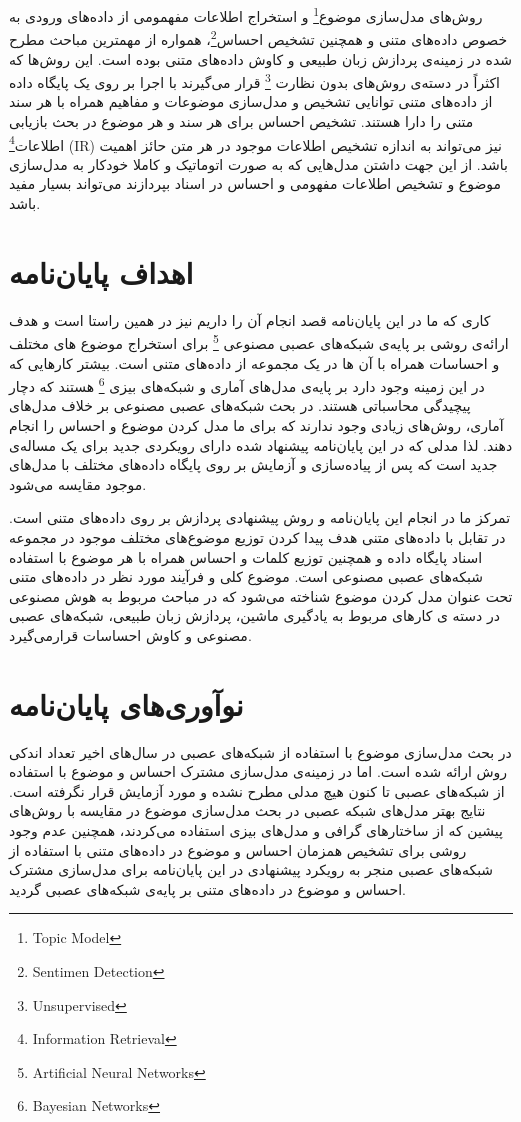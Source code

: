  		روش‌های مدل‌سازی موضوع\footnote{Topic Model}
 		و استخراج اطلاعات مفهمومی از داده‌های ورودی به خصوص داده‌های متنی و همچنین تشخیص احساس\footnote{Sentimen Detection}،
 		 همواره از مهمترین مباحث مطرح شده در زمینه‌ی پردازش زبان طبیعی و کاوش داده‌های متنی بوده است. این روش‌ها که اکثراً در دسته‌ی روش‌های بدون نظارت \footnote{Unsupervised}
 		 قرار می‌‌گیرند با اجرا بر روی یک پایگاه داده‌ از داده‌های متنی توانایی تشخیص و مدل‌سازی موضوعات و مفاهیم همراه با هر سند متنی را دارا هستند. تشخیص احساس برای هر سند و هر موضوع در بحث بازیابی اطلاعات\footnote{Information Retrieval}
 (IR)
 		 نیز می‌‌تواند به اندازه تشخیص اطلاعات موجود در هر متن حائز اهمیت باشد. از این جهت داشتن مدل‌هایی که به صورت اتوماتیک و کاملا خودکار به مدل‌سازی موضوع و تشخیص اطلاعات مفهومی‌ و احساس در اسناد بپردازند می‌تواند بسیار مفید باشد.
 		
\section{اهداف پایان‌نامه}
کاری که ما در این پایان‌‌نامه قصد انجام آن را داریم نیز در همین راستا است و هدف ارائه‌ی روشی‌ بر پایه‌ی شبکه‌های عصبی مصنوعی \footnote{Artificial Neural Networks}
برای استخراج موضوع های مختلف و احساسا‌ت همراه  با آن ها در یک مجموعه از داده‌های متنی است. بیشتر کارهایی که در این زمینه وجود دارد بر پایه‌ی مدل‌های آماری و شبکه‌های بیزی \footnote{Bayesian Networks}
هستند که دچار پیچیدگی محاسباتی هستند. در بحث شبکه‌های عصبی مصنوعی بر خلاف مدل‌های آماری، روش‌های زیادی وجود ندارند که برای ما مدل کردن موضوع و احساس را انجام دهند. لذا مدلی‌ که در این پایان‌‌نامه پیشنهاد شده دارای رویکردی جدید برای یک مساله‌ی جدید است که پس از پیاده‌سازی و آزمایش بر روی پایگاه داده‌های مختلف با مدل‌های موجود مقایسه می‌‌شود.


تمرکز ما در انجام این پایان‌‌نامه و روش پیشنهادی پردازش بر روی داده‌های متنی است. در تقابل با داده‌های متنی هدف پیدا کردن توزیع موضوع‌های مختلف موجود در مجموعه اسناد پایگاه داده و همچنین توزیع کلمات و احساس همراه با هر موضوع با استفاده شبکه‌های عصبی مصنوعی است. موضوع کلی و فرآیند مورد نظر در داده‌های متنی تحت عنوان مدل کردن موضوع شناخته می‌‌شود که در مباحث مربوط به هوش مصنوعی در دسته ی کارهای مربوط به یادگیری ماشین، پردازش زبان طبیعی، شبکه‌های عصبی مصنوعی و کاوش احساسات قرارمی‌‌گیرد.

\section{نوآوری‌های پایان‌نامه}
در بحث مدل‌سازی موضوع با استفاده از شبکه‌های عصبی در سال‌های اخیر تعداد اندکی‌ روش ارائه شده است. اما در زمینه‌‌ی مدل‌سازی مشترک احساس و موضوع با استفاده از شبکه‌های عصبی تا کنون هیچ مدلی‌ مطرح نشده و مورد آزمایش قرار نگرفته است. نتایج بهتر مدل‌های شبکه عصبی در بحث مدل‌سازی موضوع در مقایسه با روش‌های پیشین که از ساختارهای گرافی‌ و مدل‌های بیزی استفاده می‌‌کردند، همچنین عدم وجود روشی‌ برای تشخیص همزمان احساس و موضوع در داده‌های متنی با استفاده از شبکه‌های عصبی منجر به رویکرد پیشنهادی در این پایان‌‌نامه برای مدل‌سازی مشترک احساس و موضوع در داده‌های متنی بر پایه‌ی شبکه‌های عصبی گردید.

